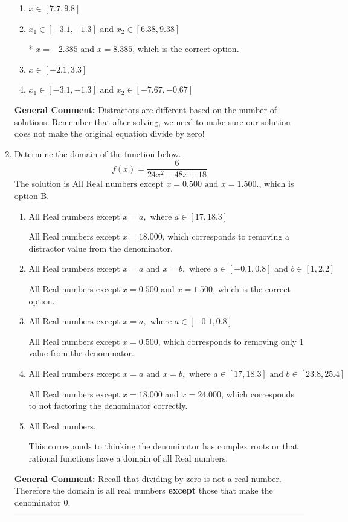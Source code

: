 \documentclass{extbook}[14pt]
\newcommand{\litem}[1]{\item #1

\rule{\textwidth}{0.4pt}}
\begin{document}
\begin{enumerate}
{\begin{enumerate}[label=\Alph*.]
\item \( x \in [7.7,9.8] \)


\item \( x_1 \in [-3.1, -1.3] \text{ and } x_2 \in [6.38,9.38] \)

* $x = -2.385 \text{ and } x = 8.385$, which is the correct option.
\item \( x \in [-2.1,3.3] \)


\item \( x_1 \in [-3.1, -1.3] \text{ and } x_2 \in [-7.67,-0.67] \)


\end{enumerate}

\textbf{General Comment:} Distractors are different based on the number of solutions. Remember that after solving, we need to make sure our solution does not make the original equation divide by zero!
}
\litem{
Determine the domain of the function below.
\[ f(x) = \frac{6}{24x^{2} -48 x + 18} \]
The solution is \( \text{All Real numbers except } x = 0.500 \text{ and } x = 1.500. \), which is option B.\begin{enumerate}[label=\Alph*.]
\item \( \text{All Real numbers except } x = a, \text{ where } a \in [17, 18.3] \)

All Real numbers except $x = 18.000$, which corresponds to removing a distractor value from the denominator.
\item \( \text{All Real numbers except } x = a \text{ and } x = b, \text{ where } a \in [-0.1, 0.8] \text{ and } b \in [1, 2.2] \)

All Real numbers except $x = 0.500$ and $x = 1.500$, which is the correct option.
\item \( \text{All Real numbers except } x = a, \text{ where } a \in [-0.1, 0.8] \)

All Real numbers except $x = 0.500$, which corresponds to removing only 1 value from the denominator.
\item \( \text{All Real numbers except } x = a \text{ and } x = b, \text{ where } a \in [17, 18.3] \text{ and } b \in [23.8, 25.4] \)

All Real numbers except $x = 18.000$ and $x = 24.000$, which corresponds to not factoring the denominator correctly.
\item \( \text{All Real numbers.} \)

This corresponds to thinking the denominator has complex roots or that rational functions have a domain of all Real numbers.
\end{enumerate}

\textbf{General Comment:} Recall that dividing by zero is not a real number. Therefore the domain is all real numbers \textbf{except} those that make the denominator 0.
}
\end{enumerate}
\end{document}
